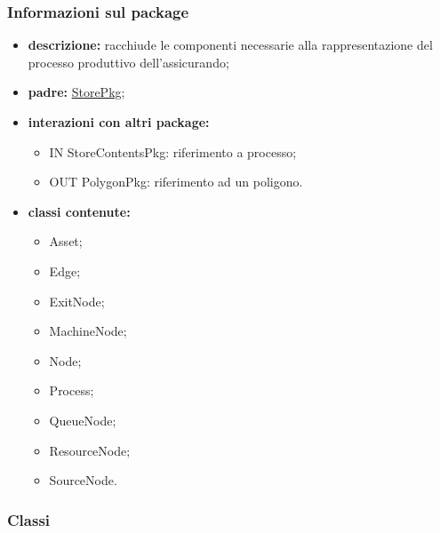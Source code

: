 \subsubsection{Informazioni sul package}
\begin{itemize}
	\item \textbf{descrizione:} racchiude le componenti necessarie alla rappresentazione del processo produttivo dell'assicurando;
	\item \textbf{padre:} \hyperref[pkg::StorePkg]{StorePkg};
	\item \textbf{interazioni con altri package:} 
	\begin{itemize}
		\item IN StoreContentsPkg: riferimento a processo;
		\item OUT PolygonPkg: riferimento ad un poligono.
	\end{itemize}
	\item \textbf{classi contenute:}
	\begin{itemize}
		\item Asset;
		\item Edge;
		\item ExitNode;
		\item MachineNode;
		\item Node;
		\item Process;
		\item QueueNode;
		\item ResourceNode;
		\item SourceNode.
	\end{itemize}
\end{itemize}
\subsubsection{Classi}
